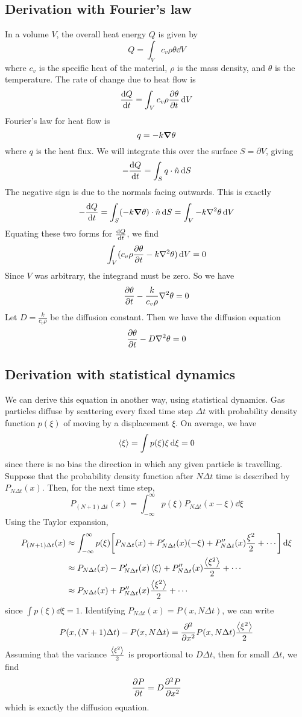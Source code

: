 \subsection{Derivation with Fourier's law}
In a volume \( V \), the overall heat energy \( Q \) is given by
\[
	Q = \int_V c_v \rho \theta \dd{V}
\]
where \( c_v \) is the specific heat of the material, \( \rho \) is the mass density, and \( \theta \) is the temperature.
The rate of change due to heat flow is
\[
	\dv{Q}{t} = \int_V c_v \rho \pdv{\theta}{t} \dd{V}
\]
Fourier's law for heat flow is
\[
	q = -k \grad{\theta}
\]
where \( q \) is the heat flux.
We will integrate this over the surface \( S = \partial V \), giving
\[
	-\dv{Q}{t} = \int_S q \cdot \hat n \dd{S}
\]
The negative sign is due to the normals facing outwards.
This is exactly
\[
	-\dv{Q}{t} = \int_S (-k \grad{\theta}) \cdot \hat n \dd{S} = \int_V -k \laplacian{\theta} \dd{V}
\]
Equating these two forms for \( \dv{Q}{t} \), we find
\[
	\int_V (c_v \rho \pdv{\theta}{t} - k \laplacian{\theta}) \dd{V} = 0
\]
Since \( V \) was arbitrary, the integrand must be zero.
So we have
\[
	\pdv{\theta}{t} - \frac{k}{c_v \rho} \laplacian{\theta} = 0
\]
Let \( D = \frac{k}{c_v \rho} \) be the diffusion constant.
Then we have the diffusion equation
\[
	\pdv{\theta}{t} - D \laplacian{\theta} = 0
\]

\subsection{Derivation with statistical dynamics}
We can derive this equation in another way, using statistical dynamics.
Gas particles diffuse by scattering every fixed time step \( \Delta t \) with probability density function \( p(\xi) \) of moving by a displacement \( \xi \).
On average, we have
\[
	\left\langle{\xi}\right\rangle = \int p(\xi) \xi \dd{\xi} = 0
\]
since there is no bias the direction in which any given particle is travelling.
Suppose that the probability density function after \( N\Delta t \) time is described by \( P_{N \Delta t}(x) \).
Then, for the next time step,
\[
	P_{(N+1)\Delta t}(x) = \int_{-\infty}^\infty p(\xi) P_{N \Delta t}(x - \xi) \dd{\xi}
\]
Using the Taylor expansion,
\begin{align*}
	P_{(N+1)\Delta t}(x) & \approx \int_{-\infty}^\infty p(\xi) \qty[P_{N \Delta t}(x) + P_{N \Delta t}'(x)(-\xi) + P_{N \Delta t}''(x)\frac{\xi^2}{2} + \cdots] \dd{\xi} \\
	                     & \approx P_{N \Delta t}(x) - P_{N \Delta t}'(x) \left\langle{\xi}\right\rangle + P_{N \Delta t}''(x) \frac{\left\langle{\xi^2}\right\rangle}{2} + \cdots                              \\
	                     & \approx P_{N \Delta t}(x) + P_{N \Delta t}''(x) \frac{\left\langle{\xi^2}\right\rangle}{2} + \cdots
\end{align*}
since \( \int p(\xi) \dd{\xi} = 1 \).
Identifying \( P_{N \Delta t}(x) = P(x, N\Delta t) \), we can write
\[
	P(x, (N+1)\Delta t) - P(x, N \Delta t) = \pdv[2]{x} P(x, N\Delta t) \frac{\left\langle{\xi^2}\right\rangle}{2}
\]
Assuming that the variance \( \frac{\left\langle{\xi^2}\right\rangle}{2} \) is proportional to \( D \Delta t \), then for small \( \Delta t \), we find
\[
	\pdv{P}{t} = D \pdv[2]{P}{x}
\]
which is exactly the diffusion equation.

